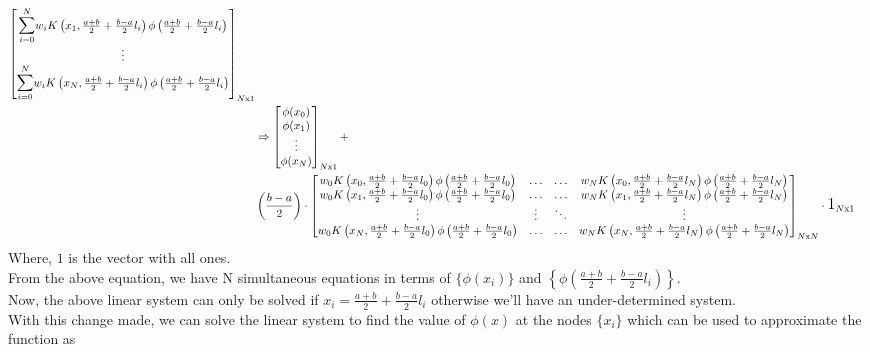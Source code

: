 \documentclass[letterpaper]{exam}
\begin{document}
\begin{questions}
\begin{solution}
\begin{align*}
\begin{bmatrix}
    \overset{N}{\underset{i = 0}{\mathlarger{\mathlarger{\sum}}}} w_i K\left(x_1,\frac{a+b}{2} + \frac{b-a}{2} l_i\right)\phi\left(\frac{a+b}{2} + \frac{b-a}{2} l_i\right)\\
    \vdots\\
    \overset{N}{\underset{i = 0}{\mathlarger{\mathlarger{\sum}}}} w_i K\left(x_N,\frac{a+b}{2} + \frac{b-a}{2} l_i\right)\phi\left(\frac{a+b}{2} + \frac{b-a}{2} l_i\right)
    \end{bmatrix}_{N\text{x}1}\\
    &\Rightarrow
    \begin{bmatrix}
    \phi(x_0)\\
    \phi(x_1)\\
    \vdots\\
    \phi(x_N)
    \end{bmatrix}_{N\text{x}1}
    +\\
    &
    \left(\frac{b-a}{2}\right)\cdot
    \begin{bmatrix}
    w_0 K\left(x_0,\frac{a+b}{2} + \frac{b-a}{2} l_0\right)\phi\left(\frac{a+b}{2} + \frac{b-a}{2} l_0\right) & \ldots & \ldots & w_N K\left(x_0,\frac{a+b}{2} + \frac{b-a}{2} l_N\right)\phi\left(\frac{a+b}{2} + \frac{b-a}{2} l_N\right)\\
    w_0 K\left(x_1,\frac{a+b}{2} + \frac{b-a}{2} l_0\right)\phi\left(\frac{a+b}{2} + \frac{b-a}{2} l_0\right) & \ldots & \ldots & w_N K\left(x_1,\frac{a+b}{2} + \frac{b-a}{2} l_N\right)\phi\left(\frac{a+b}{2} + \frac{b-a}{2} l_N\right)\\
    \vdots & \vdots & \ddots & \vdots\\
    w_0 K\left(x_N,\frac{a+b}{2} + \frac{b-a}{2} l_0\right)\phi\left(\frac{a+b}{2} + \frac{b-a}{2} l_0\right) &\ldots & \ldots & w_N K\left(x_N,\frac{a+b}{2} + \frac{b-a}{2} l_N\right)\phi\left(\frac{a+b}{2} + \frac{b-a}{2} l_N\right)
    \end{bmatrix}_{N\text{x}N}\cdot\mathlarger{\mathlarger{1}}_{N\text{x}1}
\end{align*}
Where, $1$ is the vector with all ones.\\
From the above equation, we have N simultaneous equations in terms of $\{\phi(x_i)\}$ and $\left\{\phi\left(\frac{a+b}{2} + \frac{b-a}{2} l_i\right)\right\}$.\\
Now, the above linear system can only be solved if $x_i = \frac{a+b}{2} + \frac{b-a}{2} l_i$ otherwise we'll have an under-determined system.\\
With this change made, we can solve the linear system to find the value of $\phi(x)$ at the nodes $\{x_i\}$ which can be used to approximate the function as

\end{solution}
\end{questions}
\end{document}
